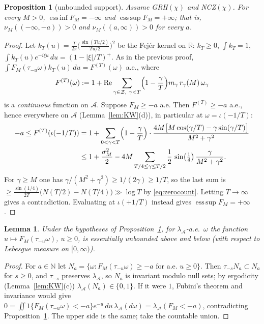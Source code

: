 \documentclass[11pt]{amsart}
\newtheorem{proposition}[theorem]{Proposition}
\newtheorem{lemma}[theorem]{Lemma}
\theoremstyle{definition}
\numberwithin{equation}{section}
\newcommand{\re}{\operatorname{Re}}
\newcommand{\cA}{\mathcal A}          %
\newcommand{\cZ}{\mathcal Z}          %
\newcommand{\hA}{\lambda_{\cA}}       %
\begin{document}
\begin{proposition}[unbounded support]\label{prop:unbounded}
Assume GRH$(\chi)$ and NCZ$(\chi)$. For every $M>0$,
$\operatorname{ess\,inf}F_M=-\infty$ and
$\operatorname{ess\,sup}F_M=+\infty$; that is,
$\nu_M((-\infty,-a))>0$ and $\nu_M((a,\infty))>0$ for every $a$.
\end{proposition}

\begin{proof}
Let $k_T(u)=\frac{T}{2\pi}\bigl(\frac{\sin(Tu/2)}{Tu/2}\bigr)^2$ be
the Fej\'er kernel on $\mathbb R$: $k_T\ge0$, $\int k_T=1$,
$\int k_T(u)e^{-i\xi u}\,du=(1-|\xi|/T)^+$. As in the previous proof,
$\int F_M(\tau_{-u}\omega)k_T(u)\,du=F^{(T)}(\omega)$ a.e., where
\[
F^{(T)}(\omega):=1+\re\sum_{\gamma\in\cZ,\ \gamma<T}
\Bigl(1-\frac\gamma T\Bigr)m_\gamma\,r_\gamma(M)\,\omega_\gamma
\]
is a \emph{continuous} function on $\cA$. Suppose $F_M\ge-a$ a.e.
Then $F^{(T)}\ge-a$ a.e., hence everywhere on $\cA$
(Lemma~\ref{lem:KW}(d)), in particular at $\omega=\iota(-1/T)$:
\begin{align*}
-a\le F^{(T)}(\iota(-1/T))
&=1+\sum_{0<\gamma<T}\Bigl(1-\frac\gamma T\Bigr)\cdot
\frac{4M\bigl[M\cos(\gamma/T)-\gamma\sin(\gamma/T)\bigr]}{M^2+\gamma^2}\\
&\le1+\frac{\sigma_M^2}{2}-4M\sum_{T/4\le\gamma\le T/2}
\frac12\,\sin\bigl(\tfrac14\bigr)\,\frac{\gamma}{M^2+\gamma^2}.
\end{align*}
For $\gamma\ge M$ one has $\gamma/(M^2+\gamma^2)\ge1/(2\gamma)\ge1/T$,
so the last sum is
$\ge\frac{\sin(1/4)}{2T}\bigl(N(T/2)-N(T/4)\bigr)\gg\log T$ by
\eqref{eq:zerocount}. Letting $T\to\infty$ gives a contradiction.
Evaluating at $\iota(+1/T)$ instead gives
$\operatorname{ess\,sup}F_M=+\infty$.
\end{proof}

\begin{lemma}\label{lem:flowunbounded}
Under the hypotheses of Proposition~\ref{prop:unbounded}, for
$\hA$-a.e.\ $\omega$ the function $u\mapsto F_M(\tau_{-u}\omega)$,
$u\ge0$, is essentially unbounded above and below (with respect to
Lebesgue measure on $[0,\infty)$).
\end{lemma}

\begin{proof}
For $a\in\mathbb N$ let
$N_a=\{\omega:F_M(\tau_{-u}\omega)\ge-a\text{ for a.e.\ }u\ge0\}$.
Then $\tau_{-s}N_a\subset N_a$ for $s\ge0$, and $\tau_{-s}$ preserves
$\hA$, so $N_a$ is invariant modulo null sets; by ergodicity
(Lemma~\ref{lem:KW}(c)) $\hA(N_a)\in\{0,1\}$. If it were $1$, Fubini's
theorem and invariance would give
$0=\iint1\{F_M(\tau_{-u}\omega)<-a\}e^{-u}\,du\,\hA(d\omega)
=\hA(F_M<-a)$, contradicting Proposition~\ref{prop:unbounded}. The
upper side is the same; take the countable union.
\end{proof}
\end{document}

